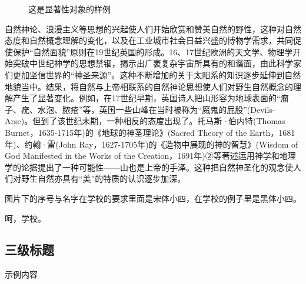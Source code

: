 \begin{figure}[htbp]
{}
\caption{\songti{}这是显著性对象的样例}
\label{fig:example}
\end{figure}




自然神论、浪漫主义等思想的兴起使人们开始欣赏和赞美自然的野性，这种对自然态度和自然概念理解的变化，以及在工业城市社会日益兴盛的博物学需求，共同促使保护“自然面貌”原则在19世纪英国的形成。16、17世纪欧洲的天文学、物理学开始突破中世纪神学的思想禁锢，揭示出广袤复杂宇宙所具有的和谐面，由此科学家们更加坚信世界的“神圣来源”。这种不断增加的关于太阳系的知识逐步延伸到自然地貌当中。结果，将自然与上帝相联系的自然神论思想使人们对野生自然概念的理解产生了显著变化。例如，在17世纪早期，英国诗人把山形容为地球表面的“瘤子、疣、水泡、脓疮”等，英国一些山峰在当时被称为“魔鬼的屁股”(Devils-Arse)。但到了该世纪末期，一种相反的态度出现了。托马斯·伯内特(Thomas Burnet，1635-1715年)的《地球的神圣理论》(Sacred Theory of the Earth，1681年)、约翰·雷(John Ray，1627-1705年)的《造物中展现的神的智慧》(Wisdom of God Manifested in the Works of the Creation，1691年)②等著述运用神学和地理学的论据提出了一种可能性——山也是上帝的手泽。这种把自然神圣化的观念使人们对野生自然亦具有“美”的特质的认识逐步加深。



图片下的序号与名字在学校的要求里面是宋体小四，在学校的例子里是黑体小四。


呵，学校。


\subsection{三级标题}
示例内容



